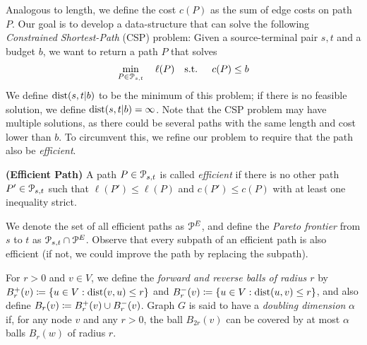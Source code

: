 Analogous to length, we define the cost $c(P)$ as the sum of edge costs on path $P$. 
Our goal is to develop a data-structure that can solve the following \emph{Constrained Shortest-Path} (CSP) problem: Given a source-terminal pair $s,t$ and a budget $b$, we want to return a path $P$ that solves
\begin{align*}
\min_{P \in \mathcal{P}_{s,t}}  \quad \ell(P) \quad
\text{s.t. } \quad  c(P) \leq b 
\end{align*}
We define $\mbox{dist}(s,t|b)$ to be the minimum of this problem; if there is no feasible solution, we define $\mbox{dist}(s,t|b)=\infty$.
Note that the CSP problem may have multiple solutions, as there could be several paths with the same length and cost lower than $b$.
To circumvent this, we refine our problem to require that the path also be \emph{efficient}. 
\begin{definition}
\textbf{(Efficient Path)} A path $P\in \mathcal{P}_{s,t}$ is called \emph{efficient} if there is no other path $P'\in \mathcal{P}_{s,t}$ such that $\ell(P')\leq \ell(P)$ and $c(P')\leq c(P)$ with at least one inequality strict.
\end{definition}
We denote the set of all efficient paths as $\mathcal{P}^E$, and define the \emph{Pareto frontier} from $s$ to $t$ as $\mathcal{P}_{s,t}\cap\mathcal{P}^E$.
Observe that every subpath of an efficient path is also efficient (if not, we could improve the path by replacing the subpath).





For $r>0$ and $v\in V$, we define the \emph{forward and reverse balls of radius $r$} by $B^+_r(v)\coloneqq\{u\in V: \mbox{dist}(v,u)\leq r\}$ and $B^-_r(v)\coloneqq\{u\in V: \mbox{dist}(u,v)\leq r\}$, and also define $B_r(v)\coloneqq B^+_r(v)\cup B^-_r(v)$.
Graph $G$ is said to have a \emph{doubling dimension} $\alpha$ if, for any node $v$ and any $r>0$, the ball $B_{2r}(v)$ can be covered by at most $\alpha$ balls $B_r(w)$ of radius $r$. 


